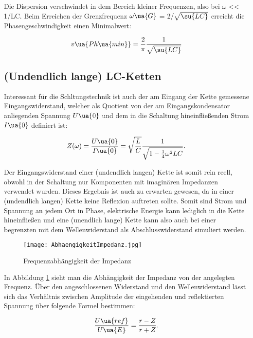 Die Dispersion verschwindet in dem Bereich kleiner Frequenzen, also bei $\omega$
<< 1/LC. Beim Erreichen der Grenzfrequenz $\omega\ua{G}$ = 2/$\sqrt{\su{LC}}$ erreicht
die Phasengeschwindigkeit einen Minimalwert:

\begin{equation}
  v\ua{Ph\ua{min}} =  \frac{2}{\pi} \frac{1}{\sqrt{\su{LC}}}
\end{equation}

\subsection{(Undendlich lange) LC-Ketten}

Interessant für die Schltungstechnik ist auch der am Eingang der Kette gemessene
Eingangswiderstand, welcher als Quotient von der am Eingangskondensator anliegenden
Spannung $U\ua{0}$ und dem in die Schaltung hineinfließenden Strom $I\ua{0}$
definiert ist:

\begin{equation}
  Z(\omega) = \frac{U\ua{0}}{I\ua{0}} = \sqrt{ \frac{L}{C}} \frac{1}{ \sqrt{1 - \frac{1}{4} \omega^2 LC} }.
\end{equation}

Der Eingangswiderstand einer (undendlich langen) Kette ist somit rein reell,
obwohl in der Schaltung nur Komponenten mit imaginären Impedanzen verwendet wurden.
Dieses Ergebnis ist auch zu erwarten gewesen, da in einer (undendlich langen) Kette
keine Reflexion auftreten sollte. Somit sind Strom und Spannung an jedem Ort in
Phase, elektrische Energie kann lediglich in die Kette hineinfließen und eine
(unendlich lange) Kette kann also auch bei einer begrenzten mit dem Wellenwiderstand
als Abschlusswiderstand simuliert werden.

\begin{figure}
  \texttt{[image: AbhaengigkeitImpedanz.jpg]}
  \caption{Frequenzabhängigkeit der Impedanz}
  \label{fig:Impedanzabhängigkeit}
\end{figure}

In Abbildung \ref{fig:Impedanzabhängigkeit} sieht man die Abhängigkeit der Impedanz
von der angelegten Frequenz.
Über den angeschlossenen Widerstand und den Wellenwiderstand lässt sich das
Verhältnis zwischen Amplitude der eingehenden und reflektierten Spannung über folgende
Formel bestimmen:

\begin{equation}
  \frac{U\ua{ref}}{U\ua{E}} = \frac{r - Z}{r + Z}.
\end{equation}


